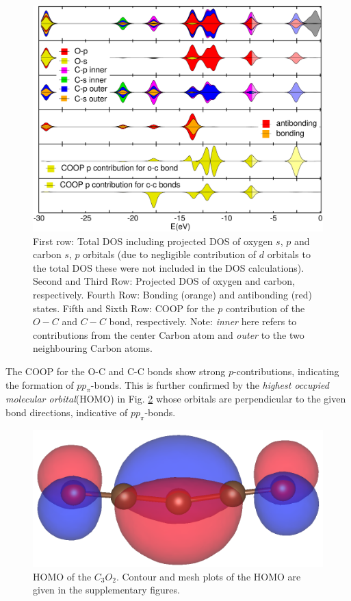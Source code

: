 \documentclass[%
 reprint,
nofootinbib,
 amsmath,amssymb,
 aps,
]{revtex4-2}
\begin{document}
\begin{figure}[t]
\includegraphics[scale=0.35]{dos_final.png}
\caption{First row: Total DOS including projected DOS of oxygen $s$, $p$ and carbon $s$, $p$ orbitals (due to negligible contribution of $d$ orbitals to the total DOS these were not included in the DOS calculations). Second and Third Row: Projected DOS of oxygen and carbon, respectively. Fourth Row: Bonding (orange) and antibonding (red) states. Fifth and Sixth Row: COOP for the $p$ contribution of the $O-C$ and $C-C$ bond, respectively. Note: \textit{inner} here refers to contributions from the center Carbon atom and \textit{outer} to the two neighbouring Carbon atoms. \label{dos_separated}}
\end{figure}


The COOP for the O-C and C-C bonds show strong $p$-contributions, indicating the formation of $pp_\pi$-bonds. This is further confirmed by the \textit{highest occupied molecular orbital}(HOMO) in Fig. \ref{HOMO} whose orbitals are perpendicular to the given bond directions, indicative of $pp_\pi$-bonds. 

\begin{figure}
    \centering
    \includegraphics[scale=0.23]{homo3.png}
    \caption{HOMO of the $C_3O_2$. Contour and mesh plots of the HOMO are given in the supplementary figures.}
    \label{HOMO}
\end{figure}
\end{document}

